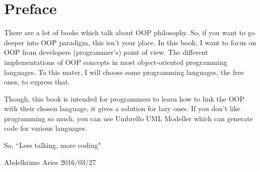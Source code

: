 \documentclass[12pt]{book}
\begin{document}
	\chapter*{Preface}
\fi

There are a lot of books which talk about OOP philosophy. 
So, if you want to go deeper into OOP paradigm, this isn't your place. 
In this book, I want to focus on OOP from developers (programmer's) point of view.
The different implementations of OOP concepts in most object-oriented programming languages.
To this mater, I will choose some programming languages, the free ones, to express that.

Though, this book is intended for programmers to learn how to link the OOP with their chosen language, it gives a solution for lazy ones. 
If you don't like programming so much, you can use Umbrello UML Modeller which can generate code for various languages. 

\vspace{2cm}
So, ``Less talking, more coding"
\vfill
\begin{flushright}
Abdelkrime Aries 2016/03/27
\end{flushright}

\ifx\wholebook\relax\else
% 
% 
	
\end{document}
